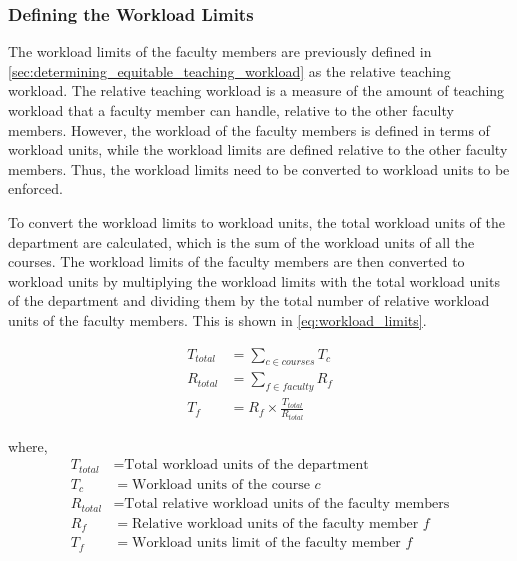 \subsubsection{Defining the Workload Limits}

The workload limits of the faculty members are previously defined in \autoref{sec:determining_equitable_teaching_workload} as the relative teaching workload. The relative teaching workload is a measure of the amount of teaching workload that a faculty member can handle, relative to the other faculty members. However, the workload of the faculty members is defined in terms of workload units, while the workload limits are defined relative to the other faculty members. Thus, the workload limits need to be converted to workload units to be enforced.

To convert the workload limits to workload units, the total workload units of the department are calculated, which is the sum of the workload units of all the courses. The workload limits of the faculty members are then converted to workload units by multiplying the workload limits with the total workload units of the department and dividing them by the total number of relative workload units of the faculty members. This is shown in \autoref{eq:workload_limits}.

\begin{equation}
  \label{eq:workload_limits}
  \begin{aligned}
    T_{total} & = \sum_{c \in courses} T_c               \\
    R_{total} & = \sum_{f \in faculty} R_f               \\
    T_f       & = R_f \times \frac{T_{total}}{R_{total}}
  \end{aligned}
\end{equation}

where,
\begin{align*}
  T_{total} & = \text{Total workload units of the department}               \\
  T_c       & = \text{Workload units of the course } c                      \\
  R_{total} & = \text{Total relative workload units of the faculty members} \\
  R_f       & = \text{Relative workload units of the faculty member } f     \\
  T_f       & = \text{Workload units limit of the faculty member } f
\end{align*}

